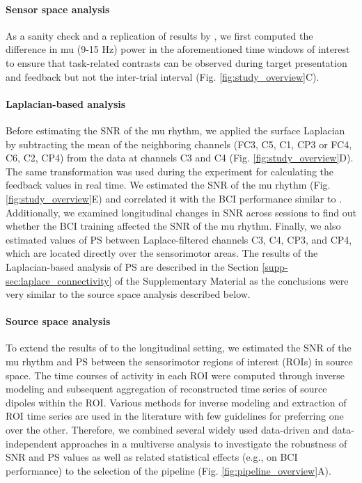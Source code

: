 \paragraph{Sensor space analysis}

As a sanity check and a replication of results by \cite{Stieger2020_analysis}, we first computed the difference in mu (9-15 Hz) power in the aforementioned time windows of interest to ensure that task-related contrasts can be observed during target presentation and feedback but not the inter-trial interval (Fig. \ref{fig:study_overview}C). 

\paragraph{Laplacian-based analysis} 

Before estimating the SNR of the mu rhythm, we applied the surface Laplacian by subtracting the mean of the neighboring channels (FC3, C5, C1, CP3 or FC4, C6, C2, CP4) from the data at channels C3 and C4 (Fig. \ref{fig:study_overview}D). The same transformation was used during the experiment for calculating the feedback values in real time. We estimated the SNR of the mu rhythm (Fig. \ref{fig:study_overview}E) and correlated it with the BCI performance similar to \citep{Blankertz2010}. Additionally, we examined longitudinal changes in SNR across sessions to find out whether the BCI training affected the SNR of the mu rhythm. Finally, we also estimated values of PS between Laplace-filtered channels C3, C4, CP3, and CP4, which are located directly over the sensorimotor areas. The results of the Laplacian-based analysis of PS are described in the Section \ref{supp-sec:laplace_connectivity} of the Supplementary Material as the conclusions were very similar to the source space analysis described below.

\paragraph{Source space analysis}

To extend the results of \citep{Vidaurre2020} to the longitudinal setting, we estimated the SNR of the mu rhythm and PS between the sensorimotor regions of interest (ROIs) in source space. The time courses of activity in each ROI were computed through inverse modeling and subsequent aggregation of reconstructed time series of source dipoles within the ROI. Various methods for inverse modeling and extraction of ROI time series are used in the literature with few guidelines for preferring one over the other. Therefore, we combined several widely used data-driven and data-independent approaches in a multiverse analysis \citep{Steegen2016} to investigate the robustness of SNR and PS values as well as related statistical effects (e.g., on BCI performance) to the selection of the pipeline (Fig. \ref{fig:pipeline_overview}A). 

